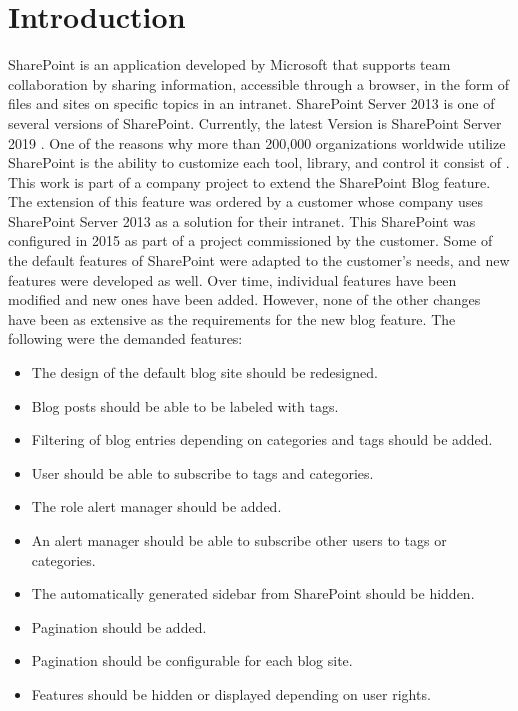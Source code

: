 \documentclass[Bachelor,BIF,english]{twbook}
\begin{document}
\chapter{Introduction}
SharePoint \cite{SharePoint} is an application developed by Microsoft that supports team collaboration by sharing information, accessible through a browser, in the form of files and sites on specific topics in an intranet. SharePoint Server 2013 is one of several versions of SharePoint. Currently, the latest Version is SharePoint Server 2019 \cite{SharePoint}. One of the reasons why more than 200,000 organizations worldwide utilize SharePoint is the ability to customize each tool, library, and control it consist of \cite{SharePoint} \cite{SharePointDevRef}.
\\[\baselineskip]
This work is part of a company project to extend the SharePoint Blog feature. The extension of this feature was ordered by a customer whose company uses SharePoint Server 2013 as a solution for their intranet. This SharePoint was configured in 2015 as part of a project commissioned by the customer. Some of the default features of SharePoint were adapted to the customer's needs, and new features were developed as well. Over time, individual features have been modified and new ones have been added. However, none of the other changes have been as extensive as the requirements for the new blog feature. The following were the demanded features: 
\begin{itemize}
\item The design of the default blog site should be redesigned.
\item Blog posts should be able to be labeled with tags. 
\item Filtering of blog entries depending on categories and tags should be added.
\item User should be able to subscribe to tags and categories. 
\item The role alert manager should be added.
\item An alert manager should be able to subscribe other users to tags or categories.
\item The automatically generated sidebar from SharePoint should be hidden. 
\item Pagination should be added.
\item Pagination should be configurable for each blog site.
\item Features should be hidden or displayed depending on user rights.
\end{itemize}
\end{document}
